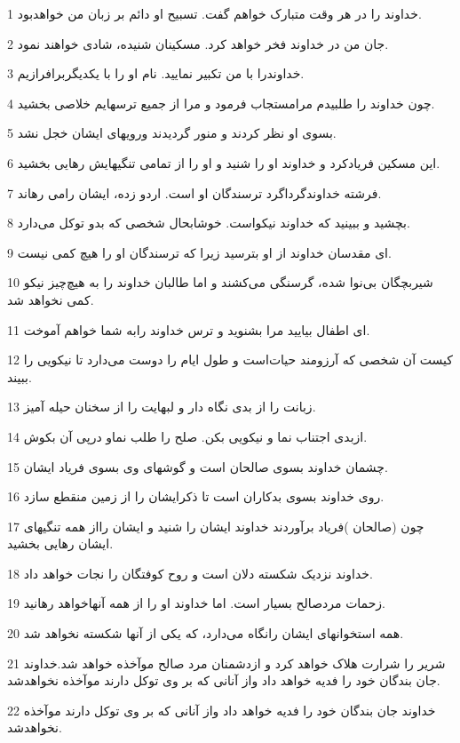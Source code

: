 \par 1 خداوند را در هر وقت متبارک خواهم گفت. تسبیح او دائم بر زبان من خواهدبود.
\par 2 جان من در خداوند فخر خواهد کرد. مسکینان شنیده، شادی خواهند نمود.
\par 3 خداوندرا با من تکبیر نمایید. نام او را با یکدیگربرافرازیم.
\par 4 چون خداوند را طلبیدم مرامستجاب فرمود و مرا از جمیع ترسهایم خلاصی بخشید.
\par 5 بسوی او نظر کردند و منور گردیدند ورویهای ایشان خجل نشد.
\par 6 این مسکین فریادکرد و خداوند او را شنید و او را از تمامی تنگیهایش رهایی بخشید.
\par 7 فرشته خداوندگرداگرد ترسندگان او است. اردو زده، ایشان رامی رهاند.
\par 8 بچشید و ببینید که خداوند نیکواست. خوشابحال شخصی که بدو توکل می‌دارد.
\par 9 ‌ای مقدسان خداوند از او بترسید زیرا که ترسندگان او را هیچ کمی نیست.
\par 10 شیربچگان بی‌نوا شده، گرسنگی می‌کشند و اما طالبان خداوند را به هیچ‌چیز نیکو کمی نخواهد شد.
\par 11 ‌ای اطفال بیایید مرا بشنوید و ترس خداوند رابه شما خواهم آموخت.
\par 12 کیست آن شخصی که آرزومند حیات‌است و طول ایام را دوست می‌دارد تا نیکویی را ببیند.
\par 13 زبانت را از بدی نگاه دار و لبهایت را از سخنان حیله آمیز.
\par 14 ازبدی اجتناب نما و نیکویی بکن. صلح را طلب نماو در‌پی آن بکوش.
\par 15 چشمان خداوند بسوی صالحان است و گوشهای وی بسوی فریاد ایشان.
\par 16 روی خداوند بسوی بدکاران است تا ذکرایشان را از زمین منقطع سازد.
\par 17 چون (صالحان )فریاد برآوردند خداوند ایشان را شنید و ایشان رااز همه تنگیهای ایشان رهایی بخشید.
\par 18 خداوند نزدیک شکسته دلان است و روح کوفتگان را نجات خواهد داد.
\par 19 زحمات مردصالح بسیار است. اما خداوند او را از همه آنهاخواهد رهانید.
\par 20 همه استخوانهای ایشان رانگاه می‌دارد، که یکی از آنها شکسته نخواهد شد.
\par 21 شریر را شرارت هلاک خواهد کرد و ازدشمنان مرد صالح موآخذه خواهد شد.خداوند جان بندگان خود را فدیه خواهد داد واز آنانی که بر وی توکل دارند موآخذه نخواهدشد.
\par 22 خداوند جان بندگان خود را فدیه خواهد داد واز آنانی که بر وی توکل دارند موآخذه نخواهدشد.
 
